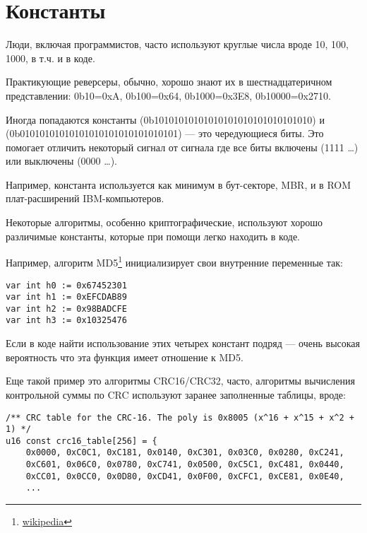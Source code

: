 \section{Константы}

Люди, включая программистов, часто используют круглые числа вроде 10, 100, 1000, в т.ч. и в коде.

Практикующие реверсеры, обычно, хорошо знают их в шестнадцатеричном представлении:
0b10=0xA, 0b100=0x64, 0b1000=0x3E8, 0b10000=0x2710.

Иногда попадаются константы  (0b10101010101010101010101010101010) и \\
 (0b01010101010101010101010101010101) --- это чередующиеся биты.
Это помогает отличить некоторый сигнал от сигнала где все биты включены (1111 \dots) или выключены (0000 \dots).

Например, константа  используется как минимум в бут-секторе, \ac{MBR}, 
и в \ac{ROM} плат-расширений IBM-компьютеров.

Некоторые алгоритмы, особенно криптографические, используют хорошо различимые константы, 
которые при помощи \IDA легко находить в коде.

\newcommand{\URLMD}{http://go.yurichev.com/17110}

Например, алгоритм MD5\footnote{\href{\URLMD}{wikipedia}} инициализирует свои внутренние переменные так:

\begin{verbatim}
var int h0 := 0x67452301
var int h1 := 0xEFCDAB89
var int h2 := 0x98BADCFE
var int h3 := 0x10325476
\end{verbatim}

Если в коде найти использование этих четырех констант подряд --- очень высокая вероятность что эта функция имеет отношение к MD5.

\par
Еще такой пример это алгоритмы CRC16/CRC32, часто, алгоритмы вычисления контрольной суммы по CRC 
используют заранее заполненные таблицы, вроде:

\begin{lstlisting}[caption=linux/lib/crc16.c]
/** CRC table for the CRC-16. The poly is 0x8005 (x^16 + x^15 + x^2 + 1) */
u16 const crc16_table[256] = {
	0x0000, 0xC0C1, 0xC181, 0x0140, 0xC301, 0x03C0, 0x0280, 0xC241,
	0xC601, 0x06C0, 0x0780, 0xC741, 0x0500, 0xC5C1, 0xC481, 0x0440,
	0xCC01, 0x0CC0, 0x0D80, 0xCD41, 0x0F00, 0xCFC1, 0xCE81, 0x0E40,
	...
\end{lstlisting}

